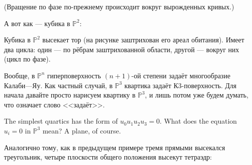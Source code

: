 \documentclass[11pt]{article}
\theoremstyle{remark}
\theoremstyle{definition}
\begin{document}
(Вращение по фазе по-прежнему происходит вокруг вырожденных кривых.)


А вот как --- кубика в $\mathbb{P}^2$:

\begin{center}
\end{center}

Кубика в $\mathbb{P}^2$ высекает тор (на рисунке заштрихован его ареал обитания). Имеет два цикла: один --- по рёбрам заштрихованной области, другой --- вокруг них (цикл по фазе).

Вообще, в $\mathbb{P}^n$ гиперповерхность $(n+1)$-ой степени задаёт многообразие Калаби---Яу. Как частный случай, в $\mathbb{P}^3$
квартика задаёт К3-поверхность. Для начала давайте просто нарисуем квартику в $\mathbb{P}^3$, и лишь потом уже будем думать, что означает слово <<задаёт>>.

The simplest quartics has the form of $u_0 u_1 u_2 u_3 = 0$. What does the equation $u_i = 0$ in $\mathbb{P}^3$ mean? A plane, of course.

Аналогично тому, как в предыдущем примере тремя прямыми высекался треугольник, четыре плоскости общего положения высекут тетраэдр:


\begin{center}
\end{center}
\end{document}

